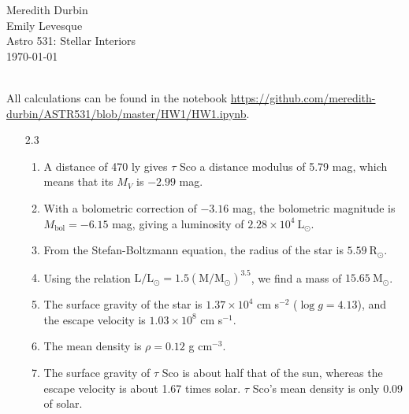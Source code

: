 \documentclass[11pt]{article}
\newcommand\lsol{\mathrm{L}_\odot}
\newcommand\rsol{\mathrm{R}_\odot}
\newcommand\msol{\mathrm{M}_\odot}
\begin{document}
\begin{flushright}Meredith Durbin\\
Emily Levesque\\
Astro 531: Stellar Interiors\\
\today\\

\end{flushright}

 \\[6pt]

All calculations can be found in the notebook \url{https://github.com/meredith-durbin/ASTR531/blob/master/HW1/HW1.ipynb}.


\begin{enumerate}

\item [2.3]
	\begin{enumerate}
	
    \item A distance of 470 ly gives $\tau$ Sco a distance modulus of 5.79 mag, which means that its $M_V$ is $-2.99$ mag.
    
    \item With a bolometric correction of $-3.16$ mag, the bolometric magnitude is $M_\mathrm{bol} = -6.15$ mag, giving a luminosity of $2.28 \times 10^4~\lsol$.
    
    \item From the Stefan-Boltzmann equation, the radius of the star is $5.59~\rsol$.

    \item Using the relation $\mathrm{L}/\lsol = 1.5(\mathrm{M}/\msol)^{3.5}$, we find a mass of $15.65~\msol$.
    
    \item The surface gravity of the star is $1.37 \times 10^4$ cm s$^{-2}$ ($\log g = 4.13$), and the escape velocity is $1.03 \times 10^8$ cm s$^{-1}$.
    
    \item The mean density is $\rho = 0.12$ g cm$^{-3}$.
    
    \item The surface gravity of $\tau$ Sco is about half that of the sun, whereas the escape velocity is about 1.67 times solar. $\tau$ Sco's mean density is only 0.09 of solar.
    
    \end{enumerate}


\end{enumerate}
\end{document}
